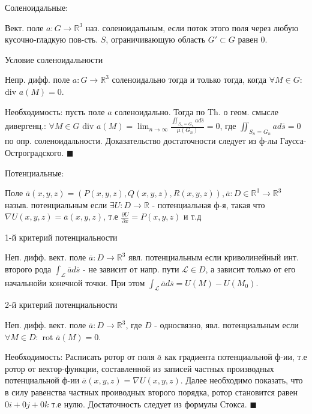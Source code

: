 \documentclass[unicode,10pt, landscape]{article}
\newenvironment{Proof} %
{\par\noindent{\bf Док-во:}} %
{\hfill$\scriptstyle\blacksquare$}
\begin{document}
\begin{multicols}{4}
 Соленоидальные:
 \begin{Def}
  Вект. поле $a: G \to \mathbb{R}^3$ наз. соленоидальным, если поток этого поля через любую кусочно-гладкую пов-сть. $S$, ограничивающую область $G' \subset G$ равен 0.
 \end{Def}
 Условие соленоидальности
 \begin{Th}
  Непр. дифф. поле $a : G \to \mathbb{R}^3$ соленоидально тогда и только тогда, когда $\forall M \in G : $ div $a(M) = 0$.
  \begin{Proof}
   Необходимость: пусть поле $a$ соленоидально. Тогда по Th. о геом. смысле дивергенц.: $\forall M \in G $ div $a(M) = \lim_{n\to\infty}\frac{\iint_{S_n = G_n} ad\overline{s}}{\mu(G_n)} = 0$, где $\iint_{S_n = G_n} ad\overline{s} = 0$ по опр. соленоидальности.
   Доказательство достаточности следует из ф-лы Гаусса-Остроградского.
  \end{Proof}
 \end{Th}

 Потенциальные:
 \begin{Def}
  Поле $\overline{a}(x, y, z) = (P(x, y, z), Q(x, y, z), R(x, y, z)), \overline{a} : D \in \mathbb{R}^3 \to \mathbb{R}^3$ назыв. потенциальным если $\exists U: D \to \mathbb{R}$ - потенциальная ф-я, такая что $\nabla U(x, y, z) = \overline{a}(x, y, z)$, т.е $\frac{\partial U}{\partial x} = P(x, y, z)$ и т.д
 \end{Def}
 1-й критерий потенциальности
 \begin{Th}
  Неп. дифф. вект. поле $\overline{a}: D \to \mathbb{R}^3$ явл. потенциальным если криволинейный инт. второго рода $\int_{\mathcal{L}}\overline{a}d\overline{s}$ - не зависит от напр. пути $\mathcal{L} \in D$, а зависит только от его начальнойи конечной точки. При этом $\int_{\mathcal{L}}\overline{a}d\overline{s} = U(M) - U(M_0)$.
 \end{Th}
 2-й критерий потенциальности
 \begin{Th}
  Неп. дифф. вект. поле $\overline{a}: D \to \mathbb{R}^3$, где $D$ - односвязно, явл. потенциальным если $\forall M \in D: $ rot $\overline{a}(M) = 0$.
  \begin{Proof}
   Необходимость: Расписать ротор от поля $\overline{a}$ как градиента потенциальной ф-ии, т.е ротор от вектор-функции, составленной из записей частных производных потенциальной ф-ии $\overline{a}(x, y, z) = \nabla U(x, y, z)$. Далее необходимо показать, что в силу равенства частных проиводных второго порядка, ротор становится равен $0i + 0j + 0k$ т.е нулю.
   Достаточность следует из формулы Стокса.
  \end{Proof}
 \end{Th}


\end{multicols}
\end{document}

